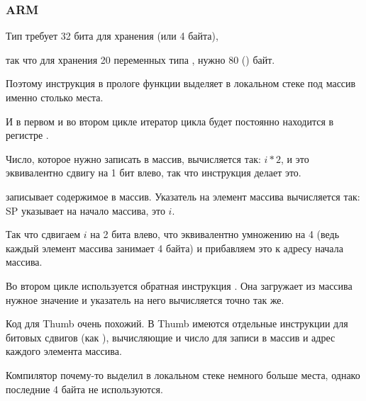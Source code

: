 \subsubsection{ARM}

\myparagraph{\NonOptimizingKeilVI (\ARMMode)}



Тип \Tint требует 32 бита для хранения (или 4 байта),

так что для хранения 20 переменных типа \Tint, нужно 80 () байт.

Поэтому инструкция  
в прологе функции выделяет в локальном стеке под массив именно столько места.

И в первом и во втором цикле итератор цикла  будет постоянно находится в регистре .

Число, которое нужно записать в массив, вычисляется так: $i*2$, и это эквивалентно 
сдвигу на 1 бит влево, так что инструкция  делает это.

 записывает содержимое  в массив.
Указатель на элемент массива вычисляется так: \ac{SP} указывает на начало массива,  это $i$.

Так что сдвигаем $i$ на 2 бита влево, что эквивалентно умножению на 4 
(ведь каждый элемент массива занимает 4 байта) и прибавляем это к адресу начала массива.

Во втором цикле используется обратная инструкция .
Она загружает из массива нужное значение и указатель на него вычисляется точно так же.

\myparagraph{\OptimizingKeilVI (\ThumbMode)}



Код для Thumb очень похожий.
В Thumb имеются отдельные инструкции для битовых сдвигов (как ), 
вычисляющие и число для записи в массив и адрес каждого элемента массива.

Компилятор почему-то выделил в локальном стеке немного больше места, 
однако последние 4 байта не используются.




